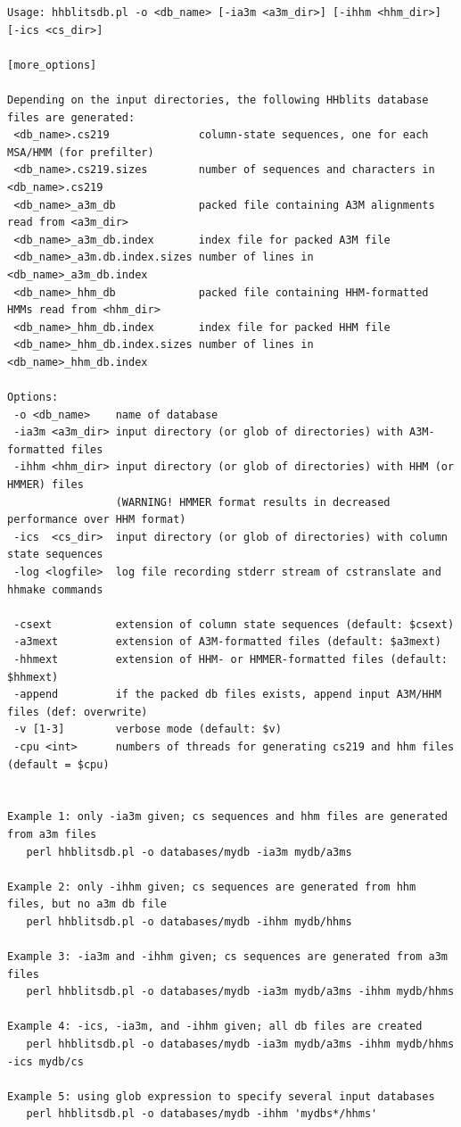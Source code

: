 \documentclass[11pt,a4paper]{article}
\begin{document}
\small 
\begin{verbatim}
Usage: hhblitsdb.pl -o <db_name> [-ia3m <a3m_dir>] [-ihhm <hhm_dir>] [-ics <cs_dir>] 
                                                                            [more_options]

Depending on the input directories, the following HHblits database files are generated:
 <db_name>.cs219              column-state sequences, one for each MSA/HMM (for prefilter)
 <db_name>.cs219.sizes        number of sequences and characters in <db_name>.cs219
 <db_name>_a3m_db             packed file containing A3M alignments read from <a3m_dir>
 <db_name>_a3m_db.index       index file for packed A3M file
 <db_name>_a3m.db.index.sizes number of lines in <db_name>_a3m_db.index
 <db_name>_hhm_db             packed file containing HHM-formatted HMMs read from <hhm_dir>
 <db_name>_hhm_db.index       index file for packed HHM file
 <db_name>_hhm_db.index.sizes number of lines in <db_name>_hhm_db.index

Options:
 -o <db_name>    name of database
 -ia3m <a3m_dir> input directory (or glob of directories) with A3M-formatted files
 -ihhm <hhm_dir> input directory (or glob of directories) with HHM (or HMMER) files 
                 (WARNING! HMMER format results in decreased performance over HHM format)
 -ics  <cs_dir>  input directory (or glob of directories) with column state sequences
 -log <logfile>  log file recording stderr stream of cstranslate and hhmake commands

 -csext          extension of column state sequences (default: $csext)
 -a3mext         extension of A3M-formatted files (default: $a3mext)
 -hhmext         extension of HHM- or HMMER-formatted files (default: $hhmext)
 -append         if the packed db files exists, append input A3M/HHM files (def: overwrite)
 -v [1-3]        verbose mode (default: $v)
 -cpu <int>      numbers of threads for generating cs219 and hhm files (default = $cpu)

 
Example 1: only -ia3m given; cs sequences and hhm files are generated from a3m files
   perl hhblitsdb.pl -o databases/mydb -ia3m mydb/a3ms 

Example 2: only -ihhm given; cs sequences are generated from hhm files, but no a3m db file 
   perl hhblitsdb.pl -o databases/mydb -ihhm mydb/hhms 

Example 3: -ia3m and -ihhm given; cs sequences are generated from a3m files
   perl hhblitsdb.pl -o databases/mydb -ia3m mydb/a3ms -ihhm mydb/hhms   

Example 4: -ics, -ia3m, and -ihhm given; all db files are created 
   perl hhblitsdb.pl -o databases/mydb -ia3m mydb/a3ms -ihhm mydb/hhms -ics mydb/cs  

Example 5: using glob expression to specify several input databases
   perl hhblitsdb.pl -o databases/mydb -ihhm 'mydbs*/hhms'  
\end{verbatim} 
\normalsize
\end{document}
